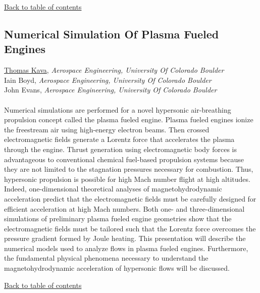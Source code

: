 \begin{flushright}\vspace{-0.2 in}\hyperlink{toc}{Back to table of contents}\end{flushright}\vspace{-0.2 in}
\hypertarget{ThomasKava}{\subsection*{\color{CUGOLD} Numerical Simulation Of Plasma Fueled Engines}} \vsp 
\underline{Thomas Kava}, \textit{Aerospace Engineering, University Of Colorado Boulder}\\ 
{Iain Boyd}, \textit{Aerospace Engineering, University Of Colorado Boulder}\\ 
{John Evans}, \textit{Aerospace Engineering, University Of Colorado Boulder}\\ 
\vspace{-0.1 in} \\ 
\noindent Numerical simulations are performed for a novel hypersonic air-breathing propulsion concept called the plasma fueled engine. Plasma fueled engines ionize the freestream air using high-energy electron beams. Then crossed electromagnetic fields generate a Lorentz force that accelerates the plasma through the engine. Thrust generation using electromagnetic body forces is advantageous to conventional chemical fuel-based propulsion systems because they are not limited to the stagnation pressures necessary for combustion. Thus, hypersonic propulsion is possible for high Mach number flight at high altitudes. Indeed, one-dimensional theoretical analyses of magnetohydrodynamic acceleration predict that the electromagnetic fields must be carefully designed for efficient acceleration at high Mach numbers. Both one- and three-dimensional simulations of preliminary plasma fueled engine geometries show that the electromagnetic fields must be tailored such that the Lorentz force overcomes the pressure gradient formed by Joule heating. This presentation will describe the numerical models used to analyze flows in plasma fueled engines. Furthermore, the fundamental physical phenomena necessary to understand the magnetohydrodynamic acceleration of hypersonic flows will be discussed.  \\ 
\begin{flushright}\vspace{-0.2 in}\hyperlink{toc}{Back to table of contents}\end{flushright}\vspace{-0.2 in}

